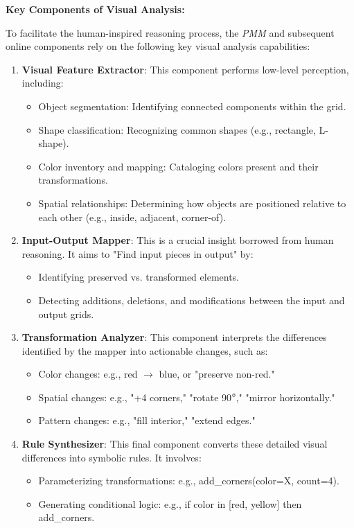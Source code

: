 \documentclass[12pt]{article}
\newcommand{\pmm}{\textit{PMM}}
\begin{document}
\textbf{Key Components of Visual Analysis:}

To facilitate the human-inspired reasoning process, the \pmm{} and subsequent online components rely on the following key visual analysis capabilities:
\begin{enumerate}[noitemsep,topsep=0pt]
\item \textbf{Visual Feature Extractor}: This component performs low-level perception, including:
\begin{itemize}[noitemsep,topsep=0pt]
\item Object segmentation: Identifying connected components within the grid.
\item Shape classification: Recognizing common shapes (e.g., rectangle, L-shape).
\item Color inventory and mapping: Cataloging colors present and their transformations.
\item Spatial relationships: Determining how objects are positioned relative to each other (e.g., inside, adjacent, corner-of).
\end{itemize}
\item \textbf{Input-Output Mapper}: This is a crucial insight borrowed from human reasoning. It aims to "Find input pieces in output" by:
\begin{itemize}[noitemsep,topsep=0pt]
\item Identifying preserved vs. transformed elements.
\item Detecting additions, deletions, and modifications between the input and output grids.
\end{itemize}
\item \textbf{Transformation Analyzer}: This component interprets the differences identified by the mapper into actionable changes, such as:
\begin{itemize}[noitemsep,topsep=0pt]
\item Color changes: e.g., red $\rightarrow$ blue, or "preserve non-red."
\item Spatial changes: e.g., "+4 corners," "rotate 90$\degree$," "mirror horizontally."
\item Pattern changes: e.g., "fill interior," "extend edges."
\end{itemize}
\item \textbf{Rule Synthesizer}: This final component converts these detailed visual differences into symbolic rules. It involves:
\begin{itemize}[noitemsep,topsep=0pt]
\item Parameterizing transformations: e.g., add\_corners(color=X, count=4).
\item Generating conditional logic: e.g., if color in [red, yellow] then add\_corners.
\end{itemize}
\end{enumerate}
\end{document}
